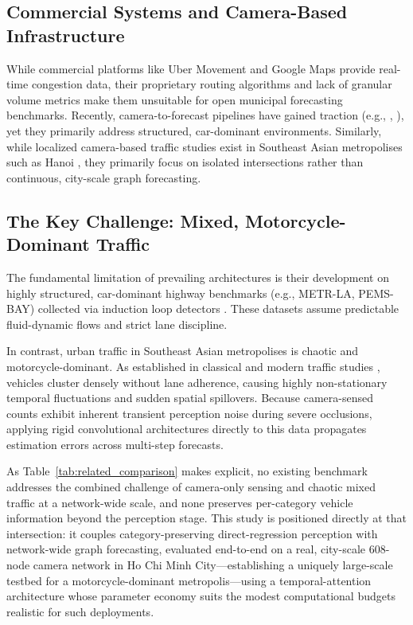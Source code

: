 \documentclass[journal,twocolumn]{IEEEtran}
\begin{document}
\subsection{Commercial Systems and Camera-Based Infrastructure}
While commercial platforms like Uber Movement and Google Maps provide real-time congestion data, their proprietary routing algorithms and lack of granular volume metrics make them unsuitable for open municipal forecasting benchmarks. Recently, camera-to-forecast pipelines have gained traction (e.g., \cite{feng2024}, \cite{liu2024}), yet they primarily address structured, car-dominant environments. Similarly, while localized camera-based traffic studies exist in Southeast Asian metropolises such as Hanoi \cite{vu2026}, they primarily focus on isolated intersections rather than continuous, city-scale graph forecasting.

\subsection{The Key Challenge: Mixed, Motorcycle-Dominant Traffic}
\label{sec:gap}

The fundamental limitation of prevailing architectures is their development on highly structured, car-dominant highway benchmarks (e.g., METR-LA, PEMS-BAY) collected via induction loop detectors \cite{dcrnn, stgcn}. These datasets assume predictable fluid-dynamic flows and strict lane discipline.

In contrast, urban traffic in Southeast Asian metropolises is chaotic and motorcycle-dominant. As established in classical and modern traffic studies \cite{minh2003, cao2007, lee2009, mixedtraffic_stgnn}, vehicles cluster densely without lane adherence, causing highly non-stationary temporal fluctuations and sudden spatial spillovers. Because camera-sensed counts exhibit inherent transient perception noise during severe occlusions, applying rigid convolutional architectures directly to this data propagates estimation errors across multi-step forecasts.

As Table~\ref{tab:related_comparison} makes explicit, no existing benchmark addresses the combined challenge of camera-only sensing and chaotic mixed traffic at a network-wide scale, and none preserves per-category vehicle information beyond the perception stage. This study is positioned directly at that intersection: it couples category-preserving direct-regression perception with network-wide graph forecasting, evaluated end-to-end on a real, city-scale 608-node camera network in Ho Chi Minh City---establishing a uniquely large-scale testbed for a motorcycle-dominant metropolis---using a temporal-attention architecture whose parameter economy suits the modest computational budgets realistic for such deployments.
\end{document}
